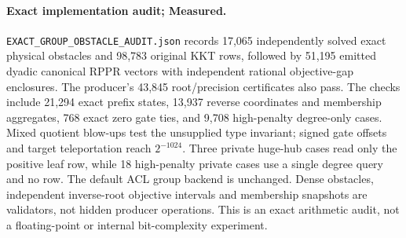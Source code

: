 \paragraph{Exact implementation audit; Measured.}
\texttt{EXACT\_GROUP\_OBSTACLE\_AUDIT.json} records 17,065 independently
solved exact physical obstacles and 98,783 original KKT rows, followed by
51,195 emitted dyadic canonical RPPR vectors with independent rational
objective-gap enclosures. The producer's 43,845 root/precision certificates
also pass. The checks include 21,294 exact prefix states, 13,937 reverse
coordinates and membership aggregates, 768 exact zero gate ties, and
9,708 high-penalty degree-only cases. Mixed quotient blow-ups test the
unsupplied type invariant; signed gate offsets and target teleportation
reach $2^{-1024}$. Three private huge-hub cases read only the positive
leaf row, while 18 high-penalty private cases use a single degree query
and no row. The default ACL group backend is unchanged. Dense obstacles,
independent inverse-root objective intervals and membership snapshots are
validators, not hidden producer operations. This is an exact arithmetic
audit, not a floating-point or internal bit-complexity experiment.
